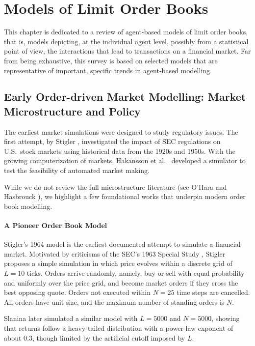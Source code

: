 \chapter{Models of Limit Order Books}
\label{chap:lob_models}

This chapter is dedicated to a review of agent-based models of limit order books, that is,
models depicting, at the individual agent level, possibly from a statistical point of view, the
interactions that lead to transactions on a financial market. Far from being exhaustive,
this survey is based on selected models that are representative of important,
specific trends in agent-based modelling.

\section{Early Order-driven Market Modelling: Market Microstructure and Policy}
The earliest market simulations were designed to study regulatory issues. The first
attempt, by Stigler \cite{stigler1964}, investigated the impact of SEC regulations on U.S.\ stock
markets using historical data from the 1920s and 1950s. With the growing computerization
of markets, Hakansson et al.\ \cite{hakansson1985} developed a simulator to test the feasibility of
automated market making.

While we do not review the full microstructure literature (see O'Hara \cite{ohara1997} and
Hasbrouck \cite{hasbrouck2007}), we highlight a few foundational works that underpin modern
order book modelling.

\subsubsection{A Pioneer Order Book Model}
Stigler's 1964 model is the earliest documented attempt to simulate a financial market.
Motivated by criticisms of the SEC’s 1963 Special Study \cite{cohen1963b,cohen1963a}, Stigler
proposes a simple simulation in which price evolves within a discrete grid of $L=10$ ticks.
Orders arrive randomly, namely, buy or sell with equal probability and uniformly over the price
grid, and become market orders if they cross the best opposing quote. Orders not executed
within $N=25$ time steps are cancelled. All orders have unit size, and the maximum number
of standing orders is $N$.

Slanina \cite{slanina2008} later simulated a similar model with $L=5000$ and $N=5000$,
showing that returns follow a heavy-tailed distribution with a power-law exponent of about
0.3, though limited by the artificial cutoff imposed by $L$.

